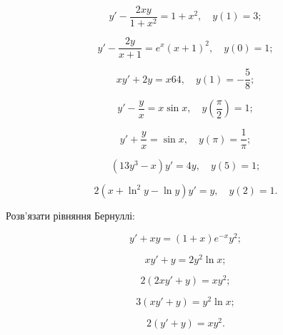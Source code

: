 \begin{problem}
	\[y'-\frac{2xy}{1+x^2}=1+x^2, \quad y(1)=3;\]
\end{problem}

\begin{problem}
	\[y'-\frac{2y}{x+1}=e^{x}(x+1)^2, \quad y(0)=1;\]
\end{problem}

\begin{problem}
	\[xy'+2y=x64,\quad y(1)=-\frac58;\]	
\end{problem}

\begin{problem}
	\[ y' - \frac yx = x \sin x, \quad y\left(\frac\pi2\right)=1;\]
\end{problem}

\begin{problem}
	\[y'+\frac yx=\sin x, \quad y(\pi)=\frac1\pi;\]
\end{problem}

\begin{problem}
	\[(13y^3-x) y'=4y, \quad y(5)=1;\]
\end{problem}

\begin{problem}
	\[2(x+\ln^2y-\ln y) y'= y, \quad y(2)=1.\]
\end{problem}

Розв'язати рівняння Бернуллі:
\begin{multicols}{2}
	\begin{problem}
		\[y'+xy=(1+x) e^{-x} y^2;\]
	\end{problem}
	
	\begin{problem}
		\[xy'+y=2y^2 \ln x;\]
	\end{problem}
	
	\begin{problem}
		\[2(2xy'+y)=xy^2;\]
	\end{problem}
	
	\begin{problem}
		\[3(xy'+y)=y^2 \ln x;\]
	\end{problem}

	\begin{problem}
		\[2(y'+y)=xy^2.\]
	\end{problem}
\end{multicols}

